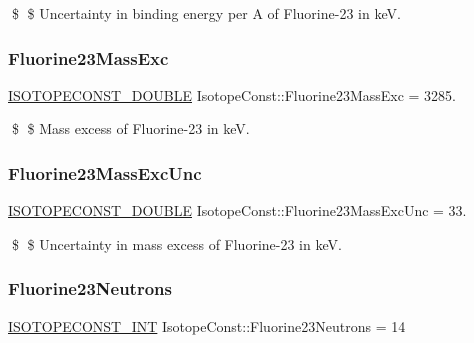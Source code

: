 \$ \$ Uncertainty in binding energy per A of Fluorine-\/23 in keV. \mbox{\label{group___isotope_const-_fluorine-_f23_gab575b349e0826fce7ef805466e4bd79b}} 
\subsubsection{\texorpdfstring{Fluorine23\+Mass\+Exc}{Fluorine23MassExc}}
{\footnotesize\ttfamily \mbox{\hyperlink{group___isotope_const-_macros_ga8f45a7272ce02c0b4c65c44636ed719a}{I\+S\+O\+T\+O\+P\+E\+C\+O\+N\+S\+T\+\_\+\+D\+O\+U\+B\+LE}} Isotope\+Const\+::\+Fluorine23\+Mass\+Exc = 3285.}

\$ \$ Mass excess of Fluorine-\/23 in keV. \mbox{\label{group___isotope_const-_fluorine-_f23_ga279c95b608638d8369448766c42dd865}} 
\subsubsection{\texorpdfstring{Fluorine23\+Mass\+Exc\+Unc}{Fluorine23MassExcUnc}}
{\footnotesize\ttfamily \mbox{\hyperlink{group___isotope_const-_macros_ga8f45a7272ce02c0b4c65c44636ed719a}{I\+S\+O\+T\+O\+P\+E\+C\+O\+N\+S\+T\+\_\+\+D\+O\+U\+B\+LE}} Isotope\+Const\+::\+Fluorine23\+Mass\+Exc\+Unc = 33.}

\$ \$ Uncertainty in mass excess of Fluorine-\/23 in keV. \mbox{\label{group___isotope_const-_fluorine-_f23_ga115434e833ccc846cf6a9c4ef3207e4a}} 
\subsubsection{\texorpdfstring{Fluorine23\+Neutrons}{Fluorine23Neutrons}}
{\footnotesize\ttfamily \mbox{\hyperlink{group___isotope_const-_macros_ga5f18360b3e99483a35c32d789e62621c}{I\+S\+O\+T\+O\+P\+E\+C\+O\+N\+S\+T\+\_\+\+I\+NT}} Isotope\+Const\+::\+Fluorine23\+Neutrons = 14}

